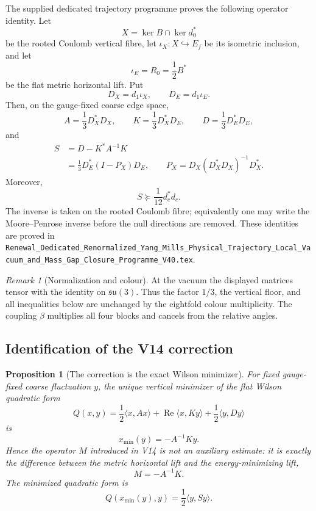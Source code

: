 \documentclass[11pt,oneside]{book}
\newtheorem{proposition}[theorem]{Proposition}
\theoremstyle{definition}
\theoremstyle{remark}
\newtheorem{remark}[theorem]{Remark}
\begin{document}
\begin{input}
\label{inp:e8v15-dtn}
The supplied dedicated trajectory programme proves the following
operator identity.  Let
\[
 X=\ker B\cap\ker d_0^*
\]
be the rooted Coulomb vertical fibre, let \(\iota_X:X\hookrightarrow
E_f\) be its isometric inclusion, and let
\[
 \iota_E=R_0=\frac12B^*
\]
be the flat metric horizontal lift.  Put
\[
 D_X=d_1\iota_X,\qquad D_E=d_1\iota_E .
\]
Then, on the gauge-fixed coarse edge space,
\[
 A=\frac13D_X^*D_X,\qquad
 K=\frac13D_X^*D_E,\qquad
 D=\frac13D_E^*D_E,
\]
and
\[
\begin{split}
 S&=D-K^*A^{-1}K\\
  &=\frac13D_E^*(I-P_X)D_E,\qquad
 P_X=D_X(D_X^*D_X)^{-1}D_X^* .
\end{split}
\]
Moreover,
\[
             S\succeq\frac1{12}d_c^*d_c .
\]
The inverse is taken on the rooted Coulomb fibre; equivalently one may
write the Moore--Penrose inverse before the null directions are
removed.  These identities are proved in
\texttt{Renewal\_Dedicated\_Renormalized\_Yang\_Mills\_Physical\_Trajectory\_Local\_Vacuum\_and\_Mass\_Gap\_Closure\_Programme\_V40.tex}.
\end{input}

\begin{remark}[Normalization and colour]
\label{rem:e8v15-colour}
At the vacuum the displayed matrices tensor with the identity on
\(\mathfrak{su}(3)\).  Thus the factor \(1/3\), the vertical floor, and
all inequalities below are unchanged by the eightfold colour
multiplicity.  The coupling \(\beta\) multiplies all four blocks and
cancels from the relative angles.
\end{remark}

\subsection{Identification of the V14 correction}

\begin{proposition}[The correction is the exact Wilson minimizer]
\label{prop:e8v15-minimizer}
For fixed gauge-fixed coarse fluctuation \(y\), the unique vertical
minimizer of the flat Wilson quadratic form
\[
 Q(x,y)=\frac12\langle x,Ax\rangle
       +\operatorname{Re}\langle x,Ky\rangle
       +\frac12\langle y,Dy\rangle
\]
is
\[
                     x_{\min}(y)=-A^{-1}Ky.
\]
Hence the operator \(M\) introduced in V14 is not an auxiliary
estimate: it is exactly the difference between the metric horizontal
lift and the energy-minimizing lift,
\[
                  M=-A^{-1}K.
\]
The minimized quadratic form is
\[
                  Q(x_{\min}(y),y)=\frac12\langle y,Sy\rangle.
\]
\end{proposition}
\end{document}
